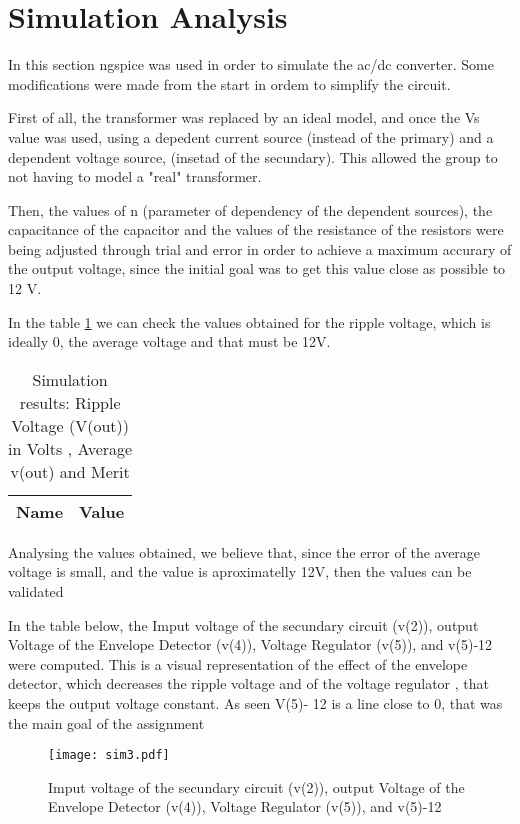 \section{Simulation Analysis}\label{section:sim}
 In this section ngspice was used in order to simulate the ac/dc converter. Some modifications were made from the start in ordem to simplify the circuit.
 
 First of all, the transformer was replaced by an ideal model, and once the Vs value was used, using a depedent current source (instead of the primary) and a dependent voltage source, (insetad of the secundary). This allowed the group to not having to model a "real" transformer. 
 
Then, the values of n (parameter of dependency of the dependent sources), the capacitance of the capacitor and the values of the resistance of the resistors were being adjusted through trial and error in order to achieve a maximum accurary of the output voltage, since the initial goal was to get this value close as possible to 12 V.


In the table \ref{tab:5} we can check the values obtained for the ripple voltage, which is ideally 0, the average voltage and that must be 12V.

\begin{table}[ht]

  \centering
  \begin{tabular}{|l|r|}
    \hline    
    {\bf Name} & {\bf Value } \\ \hline
    
  \end{tabular}
  \caption{Simulation results: Ripple Voltage (V(out)) in Volts , Average v(out) and Merit} 
  \label{tab:5}
\end{table}

Analysing the values obtained, we believe that, since the error of the average voltage is small, and the value is aproximatelly 12V, then the values can be validated

In the table below, the Imput voltage of the secundary circuit (v(2)), output Voltage of the Envelope Detector (v(4)), Voltage Regulator (v(5)), and v(5)-12 were computed. This is a visual representation of the effect of the envelope detector, which decreases the ripple voltage and of the voltage regulator , that keeps the output voltage constant. As seen V(5)- 12 is a line close to 0, that was the main goal of the assignment 

\begin{figure}[h] \centering
\texttt{[image: sim3.pdf]}
\caption{Imput voltage of the secundary circuit (v(2)), output Voltage of the Envelope Detector (v(4)), Voltage Regulator (v(5)), and v(5)-12}
\label{fig:sim5}
\end{figure}





